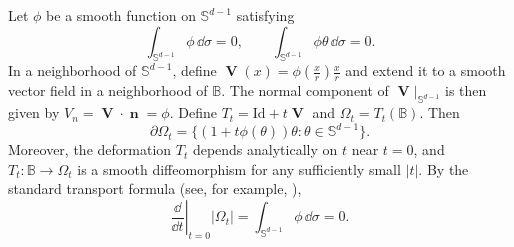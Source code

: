 \documentclass{amsart}
\numberwithin{equation}{section}
\theoremstyle{plain}
\theoremstyle{definition}
\theoremstyle{plain}
\theoremstyle{remark}
\numberwithin{figure}{section}
\DeclareMathOperator{\vv}{\mathbf{V}}
\DeclareMathOperator{\nn}{\mathbf{n}}
\newcommand{\B}{\mathbb{B}}
\newcommand{\ints}{\int_{\mathbb{S}^{d-1}}}
\begin{document}
Let $\phi$ be a smooth function on $\mathbb{S}^{d-1}$ satisfying
\begin{equation}
    \label{eq:phi01sphereharmonics}
    \ints \phi \,\dd \sigma= 0, \qquad \ints \phi \theta\,\dd \sigma =0.
\end{equation}
In a neighborhood of $\mathbb{S}^{d-1}$, define $\vv(x)=\phi(\frac{x}{r})\frac{x}{r}$ and extend it to a smooth vector field in a neighborhood of $\B$. The normal component of $\vv|_{\mathbb{S}^{d-1}}$ is then given by $V_n=\vv\cdot\nn = \phi$. Define $T_t = \text{Id}+t\vv$ and $\Omega_t=T_t(\B)$. Then
\[
    \partial\Omega_t = \{(1+t\phi(\theta))\theta: \theta\in\mathbb{S}^{d-1}\}.
\]
Moreover, the deformation $T_t$ depends analytically on $t$ near $t=0$, and $T_t:\B\to\Omega_t$ is a smooth diffeomorphism for any sufficiently small $|t|$. By the standard transport formula (see, for example, \cite[Chapter 9, \S4.1]{DZ11}),
\begin{equation}
    \label{eq:volder}
    \left.\frac{\dd}{\dd t}\right|_{t=0}|\Omega_t| = \ints \phi \,\dd \sigma= 0.
\end{equation}
\end{document}
